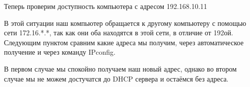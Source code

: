 \documentclass[a4paper,12pt]{article}
\begin{document}
Теперь проверим доступность компьютера с адресом 192.168.10.11
\begin{figure}[H]
\end{figure}
В этой ситуации наш компьютер обращается к другому компьютеру с помощью сети 172.16.*.*, так
как они оба находятся в этой сети, в отличие от 192ой.\\

Следующим пунктом сравним какие адреса мы получим, через автоматическое получение и через 
команду IPconfig.
\begin{figure}[H]
    \centering
\end{figure}
В первом случае мы спокойно получаем наш новый адрес, однако во втором случае мы не можем
достучатся до DHCP сервера и остаёмся без адреса.\\ 
\end{document}
